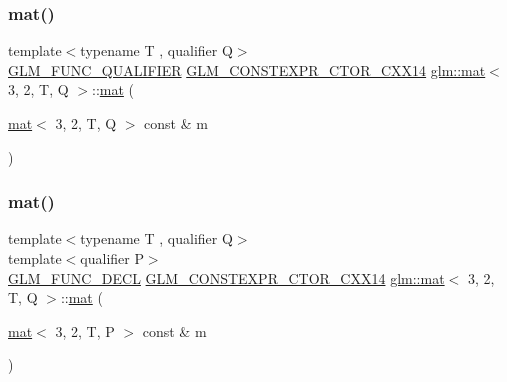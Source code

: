 \subsubsection{\texorpdfstring{mat()}{mat()}\hspace{0.1cm}{\footnotesize\ttfamily [2/21]}}
{\footnotesize\ttfamily template$<$typename T , qualifier Q$>$ \\
\hyperlink{setup_8hpp_a33fdea6f91c5f834105f7415e2a64407}{G\+L\+M\+\_\+\+F\+U\+N\+C\+\_\+\+Q\+U\+A\+L\+I\+F\+I\+ER} \hyperlink{setup_8hpp_a0900f9145e68bf6061b6f5e7be3fa751}{G\+L\+M\+\_\+\+C\+O\+N\+S\+T\+E\+X\+P\+R\+\_\+\+C\+T\+O\+R\+\_\+\+C\+X\+X14} \hyperlink{structglm_1_1mat}{glm\+::mat}$<$ 3, 2, T, Q $>$\+::\hyperlink{structglm_1_1mat}{mat} (\begin{DoxyParamCaption}\item[{\hyperlink{structglm_1_1mat}{mat}$<$ 3, 2, T, Q $>$ const \&}]{m }\end{DoxyParamCaption})}

\mbox{\label{structglm_1_1mat_3_013_00_012_00_01_t_00_01_q_01_4_a8caa3e3cecef45b321fa2583052b643c}} 
\subsubsection{\texorpdfstring{mat()}{mat()}\hspace{0.1cm}{\footnotesize\ttfamily [3/21]}}
{\footnotesize\ttfamily template$<$typename T , qualifier Q$>$ \\
template$<$qualifier P$>$ \\
\hyperlink{setup_8hpp_ab2d052de21a70539923e9bcbf6e83a51}{G\+L\+M\+\_\+\+F\+U\+N\+C\+\_\+\+D\+E\+CL} \hyperlink{setup_8hpp_a0900f9145e68bf6061b6f5e7be3fa751}{G\+L\+M\+\_\+\+C\+O\+N\+S\+T\+E\+X\+P\+R\+\_\+\+C\+T\+O\+R\+\_\+\+C\+X\+X14} \hyperlink{structglm_1_1mat}{glm\+::mat}$<$ 3, 2, T, Q $>$\+::\hyperlink{structglm_1_1mat}{mat} (\begin{DoxyParamCaption}\item[{\hyperlink{structglm_1_1mat}{mat}$<$ 3, 2, T, P $>$ const \&}]{m }\end{DoxyParamCaption})}

\mbox{\label{structglm_1_1mat_3_013_00_012_00_01_t_00_01_q_01_4_aa61b7acc7ec9310886d284d484b52aa4}} 
